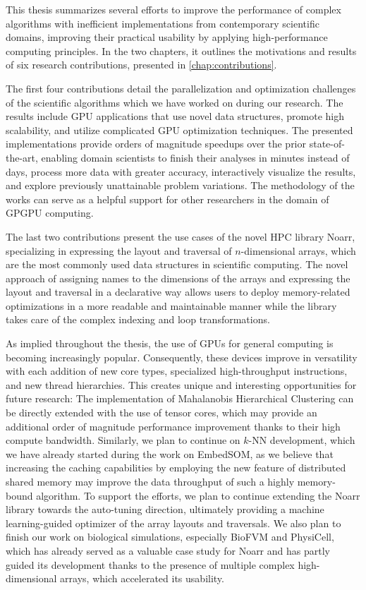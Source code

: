 
This thesis summarizes several efforts to improve the performance of complex algorithms with inefficient implementations from contemporary scientific domains, improving their practical usability by applying high-performance computing principles. In the two chapters, it outlines the motivations and results of six research contributions, presented in \cref{chap:contributions}.

The first four contributions detail the parallelization and optimization challenges of the scientific algorithms which we have worked on during our research. The results include GPU applications that use novel data structures, promote high scalability, and utilize complicated GPU optimization techniques. The presented implementations provide orders of magnitude speedups over the prior state-of-the-art, enabling domain scientists to finish their analyses in minutes instead of days, process more data with greater accuracy, interactively visualize the results, and explore previously unattainable problem variations. The methodology of the works can serve as a helpful support for other researchers in the domain of GPGPU computing.

The last two contributions present the use cases of the novel HPC library Noarr, specializing in expressing the layout and traversal of $n$-dimensional arrays, which are the most commonly used data structures in scientific computing. The novel approach of assigning names to the dimensions of the arrays and expressing the layout and traversal in a declarative way allows users to deploy memory-related optimizations in a more readable and maintainable manner while the library takes care of the complex indexing and loop transformations.

As implied throughout the thesis, the use of GPUs for general computing is becoming increasingly popular. Consequently, these devices improve in versatility with each addition of new core types, specialized high-throughput instructions, and new thread hierarchies. This creates unique and interesting opportunities for future research: The implementation of Mahalanobis Hierarchical Clustering can be directly extended with the use of tensor cores, which may provide an additional order of magnitude performance improvement thanks to their high compute bandwidth. Similarly, we plan to continue on $k$-NN development, which we have already started during the work on EmbedSOM, as we believe that increasing the caching capabilities by employing the new feature of distributed shared memory may improve the data throughput of such a highly memory-bound algorithm. To support the efforts, we plan to continue extending the Noarr library towards the auto-tuning direction, ultimately providing a machine learning-guided optimizer of the array layouts and traversals. We also plan to finish our work on biological simulations, especially BioFVM and PhysiCell, which has already served as a valuable case study for Noarr and has partly guided its development thanks to the presence of multiple complex high-dimensional arrays, which accelerated its usability.

